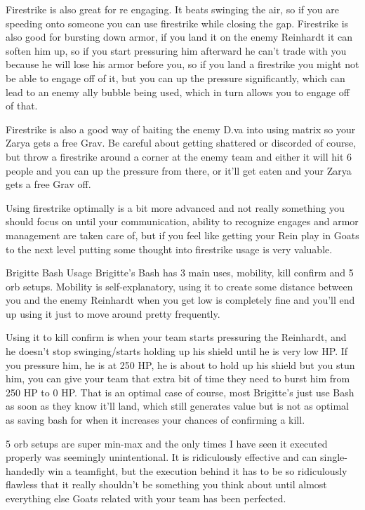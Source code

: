 Firestrike is also great for re engaging. It beats swinging the air, so if you are speeding onto someone you can use firestrike while closing the gap. Firestrike is also good for bursting down armor, if you land it on the enemy Reinhardt it can soften him up, so if you start pressuring him afterward he can’t trade with you because he will lose his armor before you, so if you land a firestrike you might not be able to engage off of it, but you can up the pressure significantly, which can lead to an enemy ally bubble being used, which in turn allows you to engage off of that.

Firestrike is also a good way of baiting the enemy D.va into using matrix so your Zarya gets a free Grav. Be careful about getting shattered or discorded of course, but throw a firestrike around a corner at the enemy team and either it will hit 6 people and you can up the pressure from there, or it’ll get eaten and your Zarya gets a free Grav off.

Using firestrike optimally is a bit more advanced and not really something you should focus on until your communication, ability to recognize engages and armor management are taken care of, but if you feel like getting your Rein play in Goats to the next level putting some thought into firestrike usage is very valuable.

Brigitte Bash Usage
Brigitte's Bash has 3 main uses, mobility, kill confirm and 5 orb setups. Mobility is self-explanatory, using it to create some distance between you and the enemy Reinhardt when you get low is completely fine and you’ll end up using it just to move around pretty frequently.

Using it to kill confirm is when your team starts pressuring the Reinhardt, and he doesn’t stop swinging/starts holding up his shield until he is very low HP. If you pressure him, he is at 250 HP, he is about to hold up his shield but you stun him, you can give your team that extra bit of time they need to burst him from 250 HP to 0 HP. That is an optimal case of course, most Brigitte's just use Bash as soon as they know it’ll land, which still generates value but is not as optimal as saving bash for when it increases your chances of confirming a kill.

5 orb setups are super min-max and the only times I have seen it executed properly was seemingly unintentional. It is ridiculously effective and can single-handedly win a teamfight, but the execution behind it has to be so ridiculously flawless that it really shouldn’t be something you think about until almost everything else Goats related with your team has been perfected.

